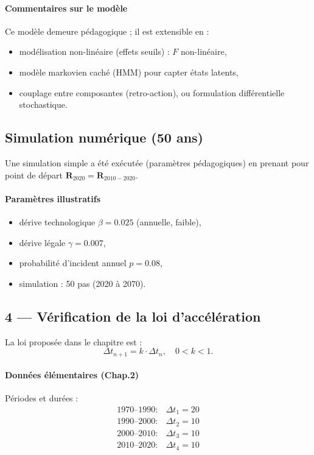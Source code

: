 \documentclass[12pt,a4paper]{article}
\begin{document}
\paragraph{Commentaires sur le modèle}
Ce modèle demeure pédagogique ; il est extensible en :
\begin{itemize}
  \item modélisation non-linéaire (effets seuils) : $F$ non-linéaire,
  \item modèle markovien caché (HMM) pour capter états latents,
  \item couplage entre composantes (retro-action), ou formulation différentielle stochastique.
\end{itemize}

\subsection{Simulation numérique (50 ans)}
Une simulation simple a été exécutée (paramètres pédagogiques) en prenant pour point de départ $\mathbf{R}_{2020}=\mathbf{R}_{2010-2020}$.

\paragraph{Paramètres illustratifs}
\begin{itemize}
  \item dérive technologique $\beta = 0.025$ (annuelle, faible),
  \item dérive légale $\gamma = 0.007$,
  \item probabilité d'incident annuel $p=0.08$,
  \item simulation : 50 pas (2020 à 2070).
\end{itemize}



\subsection{4 — Vérification de la loi d'accélération}
La loi proposée dans le chapitre est :
\[
\Delta t_{n+1} = k \cdot \Delta t_n, \quad 0<k<1.
\]

\paragraph{Données élémentaires (Chap.2)} Périodes et durées :
\[
\begin{array}{ll}
1970\text{--}1990: & \Delta t_1 = 20 \\
1990\text{--}2000: & \Delta t_2 = 10 \\
2000\text{--}2010: & \Delta t_3 = 10 \\
2010\text{--}2020: & \Delta t_4 = 10 \\
\end{array}
\]
\end{document}
